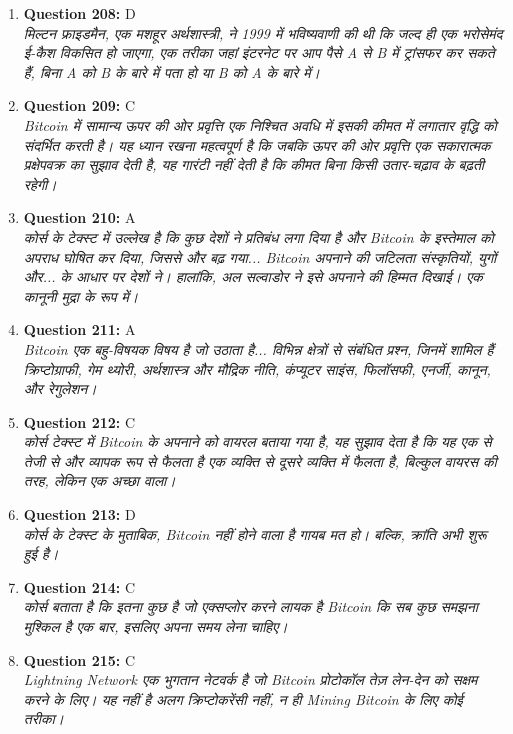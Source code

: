 \documentclass[12pt,a4paper]{article}
\begin{document}
\begin{enumerate}
\item \textbf{Question 208:} D
\\ \textit{मिल्टन फ्राइडमैन, एक मशहूर अर्थशास्त्री, ने 1999 में भविष्यवाणी की थी कि जल्द ही एक भरोसेमंद ई-कैश विकसित हो जाएगा, एक तरीका जहां इंटरनेट पर आप पैसे A से B में ट्रांसफर कर सकते हैं, बिना A को B के बारे में पता हो या B को A के बारे में।}

\item \textbf{Question 209:} C
\\ \textit{Bitcoin में सामान्य ऊपर की ओर प्रवृत्ति एक निश्चित अवधि में इसकी कीमत में लगातार वृद्धि को संदर्भित करती है। यह ध्यान रखना महत्वपूर्ण है कि जबकि ऊपर की ओर प्रवृत्ति एक सकारात्मक प्रक्षेपवक्र का सुझाव देती है, यह गारंटी नहीं देती है कि कीमत बिना किसी उतार-चढ़ाव के बढ़ती रहेगी।}

\item \textbf{Question 210:} A
\\ \textit{कोर्स के टेक्स्ट में उल्लेख है कि कुछ देशों ने प्रतिबंध लगा दिया है और Bitcoin के इस्तेमाल को अपराध घोषित कर दिया, जिससे और बढ़ गया... Bitcoin अपनाने की जटिलता संस्कृतियों, युगों और... के आधार पर देशों ने। हालांकि, अल सल्वाडोर ने इसे अपनाने की हिम्मत दिखाई। एक कानूनी मुद्रा के रूप में।}

\item \textbf{Question 211:} A
\\ \textit{Bitcoin एक बहु-विषयक विषय है जो उठाता है... विभिन्न क्षेत्रों से संबंधित प्रश्न, जिनमें शामिल हैं क्रिप्टोग्राफी, गेम थ्योरी, अर्थशास्त्र और मौद्रिक नीति, कंप्यूटर साइंस, फिलॉसफी, एनर्जी, कानून, और रेगुलेशन।}

\item \textbf{Question 212:} C
\\ \textit{कोर्स टेक्स्ट में Bitcoin के अपनाने को वायरल बताया गया है, यह सुझाव देता है कि यह एक से तेजी से और व्यापक रूप से फैलता है एक व्यक्ति से दूसरे व्यक्ति में फैलता है, बिल्कुल वायरस की तरह, लेकिन एक अच्छा वाला।}

\item \textbf{Question 213:} D
\\ \textit{कोर्स के टेक्स्ट के मुताबिक, Bitcoin नहीं होने वाला है गायब मत हो। बल्कि, क्रांति अभी शुरू हुई है।}

\item \textbf{Question 214:} C
\\ \textit{कोर्स बताता है कि इतना कुछ है जो एक्सप्लोर करने लायक है Bitcoin कि सब कुछ समझना मुश्किल है एक बार, इसलिए अपना समय लेना चाहिए।}

\item \textbf{Question 215:} C
\\ \textit{Lightning Network एक भुगतान नेटवर्क है जो Bitcoin प्रोटोकॉल तेज़ लेन-देन को सक्षम करने के लिए। यह नहीं है अलग क्रिप्टोकरेंसी नहीं, न ही Mining Bitcoin के लिए कोई तरीका।}


\end{enumerate}
\end{document}
